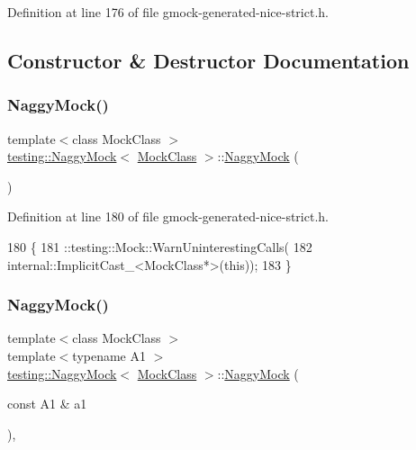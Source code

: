 Definition at line 176 of file gmock-\/generated-\/nice-\/strict.\+h.



\subsection{Constructor \& Destructor Documentation}
\mbox{\label{classtesting_1_1NaggyMock_acb769f78b93eb60b04db21250f416f70}} 
\subsubsection{\texorpdfstring{Naggy\+Mock()}{NaggyMock()}\hspace{0.1cm}{\footnotesize\ttfamily [1/11]}}
{\footnotesize\ttfamily template$<$class Mock\+Class $>$ \\
\hyperlink{classtesting_1_1NaggyMock}{testing\+::\+Naggy\+Mock}$<$ \hyperlink{classMockClass}{Mock\+Class} $>$\+::\hyperlink{classtesting_1_1NaggyMock}{Naggy\+Mock} (\begin{DoxyParamCaption}{ }\end{DoxyParamCaption})\hspace{0.3cm}{\ttfamily [inline]}}



Definition at line 180 of file gmock-\/generated-\/nice-\/strict.\+h.


\begin{DoxyCode}
180               \{
181     ::testing::Mock::WarnUninterestingCalls(
182         internal::ImplicitCast\_<MockClass*>(\textcolor{keyword}{this}));
183   \}
\end{DoxyCode}
\mbox{\label{classtesting_1_1NaggyMock_ae43ea6c6a6b66fe31cb14f93e0be5718}} 
\subsubsection{\texorpdfstring{Naggy\+Mock()}{NaggyMock()}\hspace{0.1cm}{\footnotesize\ttfamily [2/11]}}
{\footnotesize\ttfamily template$<$class Mock\+Class $>$ \\
template$<$typename A1 $>$ \\
\hyperlink{classtesting_1_1NaggyMock}{testing\+::\+Naggy\+Mock}$<$ \hyperlink{classMockClass}{Mock\+Class} $>$\+::\hyperlink{classtesting_1_1NaggyMock}{Naggy\+Mock} (\begin{DoxyParamCaption}\item[{const A1 \&}]{a1 }\end{DoxyParamCaption})\hspace{0.3cm}{\ttfamily [inline]}, {\ttfamily [explicit]}}



